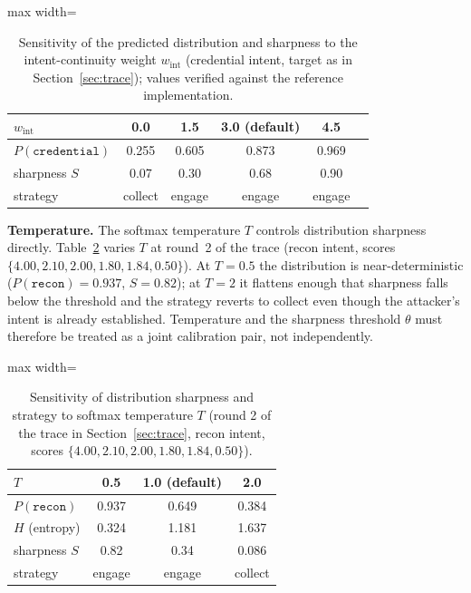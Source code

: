 \documentclass[preprints,article,accept,oneauthor]{Definitions/mdpi}
\newcommand{\act}[1]{\texttt{#1}}
\begin{document}
\begin{table}[ht]
\centering
\begin{adjustbox}{max width=\linewidth}\begin{tabular}{@{}lccccc@{}}
\toprule
$w_{\mathrm{int}}$ & 0.0 & 1.5 & 3.0 (default) & 4.5 \\
\midrule
$P(\act{credential})$ & 0.255 & 0.605 & 0.873 & 0.969 \\
sharpness $S$ & 0.07 & 0.30 & 0.68 & 0.90 \\
strategy & collect & engage & engage & engage \\
\bottomrule
\end{tabular}\end{adjustbox}
\caption{Sensitivity of the predicted distribution and sharpness to the
intent-continuity weight $w_{\mathrm{int}}$ (credential intent, target as in
Section~\ref{sec:trace}); values verified against the reference implementation.}
\label{tab:sens-int}
\end{table}

\textbf{Temperature.} The softmax temperature $T$ controls distribution
sharpness directly. Table~\ref{tab:sens-temp} varies $T$ at round~2 of the
trace (recon intent, scores $\{4.00, 2.10, 2.00, 1.80, 1.84, 0.50\}$). At
$T=0.5$ the distribution is near-deterministic ($P(\act{recon})=0.937$,
$S=0.82$); at $T=2$ it flattens enough that sharpness falls below the
threshold and the strategy reverts to collect even though the attacker's
intent is already established. Temperature and the sharpness threshold
$\theta$ must therefore be treated as a joint calibration pair, not
independently.

\begin{table}[ht]
\centering
\begin{adjustbox}{max width=\linewidth}\begin{tabular}{@{}lccc@{}}
\toprule
$T$ & 0.5 & 1.0 (default) & 2.0 \\
\midrule
$P(\act{recon})$ & 0.937 & 0.649 & 0.384 \\
$H$ (entropy) & 0.324 & 1.181 & 1.637 \\
sharpness $S$ & 0.82 & 0.34 & 0.086 \\
strategy & engage & engage & collect \\
\bottomrule
\end{tabular}\end{adjustbox}
\caption{Sensitivity of distribution sharpness and strategy to softmax
temperature $T$ (round 2 of the trace in Section~\ref{sec:trace}, recon intent,
scores $\{4.00, 2.10, 2.00, 1.80, 1.84, 0.50\}$).}
\label{tab:sens-temp}
\end{table}
\end{document}
